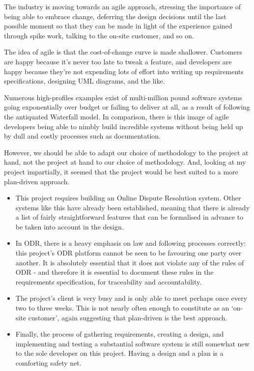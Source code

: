 The industry is moving towards an agile approach, stressing the importance of being able to embrace change, deferring the design decisions until the last possible moment so that they can be made in light of the experience gained through spike work, talking to the on-site customer, and so on.

The idea of agile is that the cost-of-change curve is made shallower. Customers are happy because it's never too late to tweak a feature, and developers are happy because they're not expending lots of effort into writing up requirements specifications, designing UML diagrams, and the like.

Numerous high-profiles examples exist of multi-million pound software systems going exponentially over budget or failing to deliver at all, as a result of following the antiquated Waterfall model. In comparison, there is this image of agile developers being able to nimbly build incredible systems without being held up by dull and costly processes such as documentation.

However, we should be able to adapt our choice of methodology to the project at hand, not the project at hand to our choice of methodology. And, looking at my project impartially, it seemed that the project would be best suited to a more plan-driven approach.

\begin{itemize}

    \item This project requires building an Online Dispute Resolution system. Other systems like this have already been established, meaning that there is already a list of fairly straightforward features that can be formalised in advance to be taken into account in the design.
    
    \item In ODR, there is a heavy emphasis on law and following processes correctly: this project's ODR platform cannot be seen to be favouring one party over another. It is absolutely essential that it does not violate any of the rules of ODR - and therefore it is essential to document these rules in the requirements specification, for traceability and accountability.
    
    \item The project's client is very busy and is only able to meet perhaps once every two to three weeks. This is not nearly often enough to constitute as an `on-site customer', again suggesting that plan-driven is the best approach.
    
    \item Finally, the process of gathering requirements, creating a design, and implementing and testing a substantial software system is still somewhat new to the sole developer on this project. Having a design and a plan is a comforting safety net.

\end{itemize}

